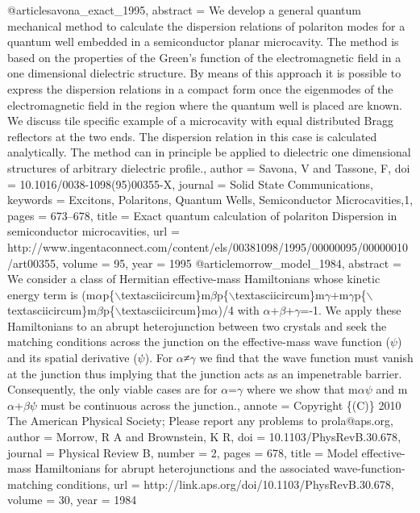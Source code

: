 @article{savona_exact_1995,
abstract = {We develop a general quantum mechanical method to calculate the dispersion relations of polariton modes for a quantum well embedded in a semiconductor planar microcavity. The method is based on the properties of the Green's function of the electromagnetic field in a one dimensional dielectric structure. By means of this approach it is possible to express the dispersion relations in a compact form once the eigenmodes of the electromagnetic field in the region where the quantum well is placed are known. We discuss tile specific example of a microcavity with equal distributed Bragg reflectors at the two ends. The dispersion relation in this case is calculated analytically. The method can in principle be applied to dielectric one dimensional structures of arbitrary dielectric profile.},
author = {Savona, V and Tassone, F},
doi = {10.1016/0038-1098(95)00355-X},
journal = {Solid State Communications},
keywords = { Excitons, Polaritons, Quantum Wells, Semiconductor Microcavities,1},
pages = {673--678},
title = {{Exact quantum calculation of polariton Dispersion in semiconductor microcavities}},
url = {http://www.ingentaconnect.com/content/els/00381098/1995/00000095/00000010/art00355},
volume = {95},
year = {1995}
}
@article{morrow_model_1984,
abstract = {We consider a class of Hermitian effective-mass Hamiltonians whose kinetic energy term is (m$\alpha$p\{$\backslash$textasciicircum\}m$\beta$p\{$\backslash$textasciicircum\}m$\gamma$+m$\gamma$p\{$\backslash$textasciicircum\}m$\beta$p\{$\backslash$textasciicircum\}m$\alpha$)/4 with $\alpha$+$\beta$+$\gamma$=-1. We apply these Hamiltonians to an abrupt heterojunction between two crystals and seek the matching conditions across the junction on the effective-mass wave function ($\psi$) and its spatial derivative ($\psi$̇). For $\alpha$≠$\gamma$ we find that the wave function must vanish at the junction thus implying that the junction acts as an impenetrable barrier. Consequently, the only viable cases are for $\alpha$=$\gamma$ where we show that m$\alpha$$\psi$ and m$\alpha$+$\beta$$\psi$̇ must be continuous across the junction.},
annote = {Copyright \{(C)\} 2010 The American Physical Society; Please report any problems to prola@aps.org},
author = {Morrow, R A and Brownstein, K R},
doi = {10.1103/PhysRevB.30.678},
journal = {Physical Review B},
number = {2},
pages = {678},
title = {{Model effective-mass Hamiltonians for abrupt heterojunctions and the associated wave-function-matching conditions}},
url = {http://link.aps.org/doi/10.1103/PhysRevB.30.678},
volume = {30},
year = {1984}
}
